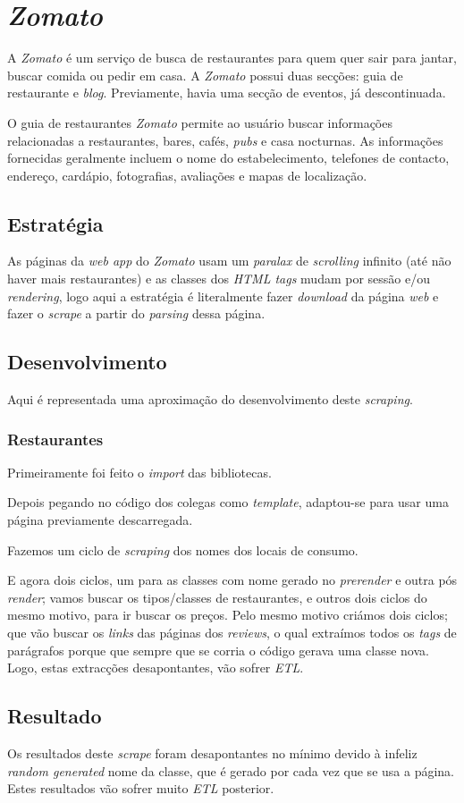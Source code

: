 \section{\textit{Zomato}}
A \textit{Zomato} é um serviço de busca de restaurantes para quem quer sair para jantar, buscar comida ou pedir em casa. A \textit{Zomato} possui duas secções: guia de restaurante e \textit{blog}. Previamente, havia uma secção de eventos, já descontinuada.

O guia de restaurantes \textit{Zomato} permite ao usuário buscar informações relacionadas a restaurantes, bares, cafés, \textit{pubs} e casa nocturnas. As informações fornecidas geralmente incluem o nome do estabelecimento, telefones de contacto, endereço, cardápio, fotografias, avaliações e mapas de localização.

\subsection{Estratégia}
As páginas da \textit{web app} do \textit{Zomato} usam um \textit{paralax} de \textit{scrolling} infinito (até não haver mais restaurantes) e as classes dos \textit{HTML tags} mudam por sessão e/ou \textit{rendering}, logo aqui a estratégia é literalmente fazer \textit{download} da página \textit{web} e fazer o \textit{scrape} a partir do \textit{parsing} dessa página.

\subsection{Desenvolvimento}
Aqui é representada uma aproximação do desenvolvimento deste \textit{scraping}.
\subsubsection{Restaurantes}
Primeiramente foi feito o \textit{import} das bibliotecas.

Depois pegando no código dos colegas como \textit{template}, adaptou-se para usar uma página previamente descarregada.

Fazemos um ciclo de \textit{scraping} dos nomes dos locais de consumo.

E agora dois ciclos, um para as classes com nome gerado no \textit{prerender} e outra pós \textit{render}; vamos buscar os tipos/classes de restaurantes, e outros dois ciclos do mesmo motivo, para ir buscar os preços. Pelo mesmo motivo criámos dois ciclos; que vão buscar os \textit{links} das páginas dos \textit{reviews}, o qual extraímos todos os \textit{tags} de parágrafos porque que sempre que se corria o código gerava uma classe nova.
Logo, estas extracções desapontantes, vão sofrer \textit{ETL}.

\subsection{Resultado}
Os resultados deste \textit{scrape} foram desapontantes no mínimo devido à infeliz \textit{random generated} nome da classe, que é gerado por cada vez que se usa a página. Estes resultados vão sofrer muito \textit{ETL} posterior.